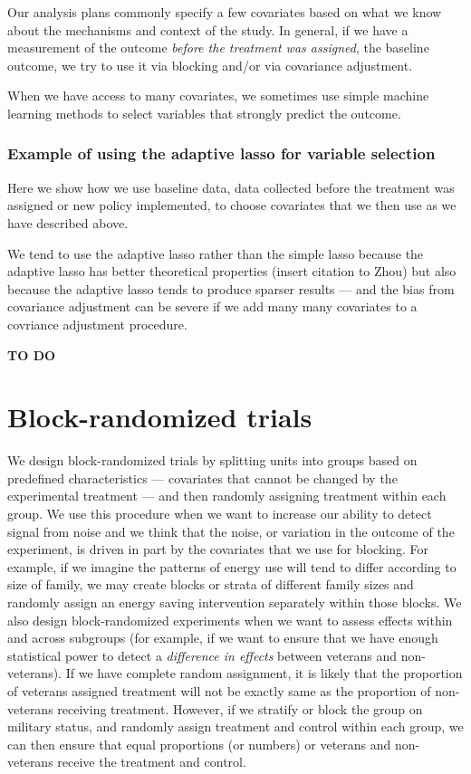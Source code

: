 \documentclass[
  12pt,
]{book}
\theoremstyle{definition}
\theoremstyle{definition}
\theoremstyle{definition}
\theoremstyle{remark}
\begin{document}
Our analysis plans commonly specify a few covariates based on what we
know about the mechanisms and context of the study. In general, if we
have a measurement of the outcome \emph{before the treatment was
assigned}, the baseline outcome, we try to use it via blocking and/or
via covariance adjustment.

When we have access to many covariates, we sometimes use simple machine
learning methods to select variables that strongly predict the outcome.

\hypertarget{example-of-using-the-adaptive-lasso-for-variable-selection}{%
\subsubsection{Example of using the adaptive lasso for variable
selection}\label{example-of-using-the-adaptive-lasso-for-variable-selection}}

Here we show how we use baseline data, data collected before the
treatment was assigned or new policy implemented, to choose covariates
that we then use as we have described above.

We tend to use the adaptive lasso rather than the simple lasso because
the adaptive lasso has better theoretical properties (insert citation to
Zhou) but also because the adaptive lasso tends to produce sparser
results --- and the bias from covariance adjustment can be severe if we
add many many covariates to a covriance adjustment procedure.

\textbf{TO DO}

\hypertarget{blockrandanalysis}{%
\section{Block-randomized trials}\label{blockrandanalysis}}

We design block-randomized trials by splitting units into groups based
on predefined characteristics --- covariates that cannot be changed by
the experimental treatment --- and then randomly assigning treatment
within each group. We use this procedure when we want to increase our
ability to detect signal from noise and we think that the noise, or
variation in the outcome of the experiment, is driven in part by the
covariates that we use for blocking. For example, if we imagine the
patterns of energy use will tend to differ according to size of family,
we may create blocks or strata of different family sizes and randomly
assign an energy saving intervention separately within those blocks. We
also design block-randomized experiments when we want to assess effects
within and across subgroups (for example, if we want to ensure that we
have enough statistical power to detect a \emph{difference in effects}
between veterans and non-veterans). If we have complete random
assignment, it is likely that the proportion of veterans assigned
treatment will not be exactly same as the proportion of non-veterans
receiving treatment. However, if we stratify or block the group on
military status, and randomly assign treatment and control within each
group, we can then ensure that equal proportions (or numbers) or
veterans and non-veterans receive the treatment and control.
\end{document}
